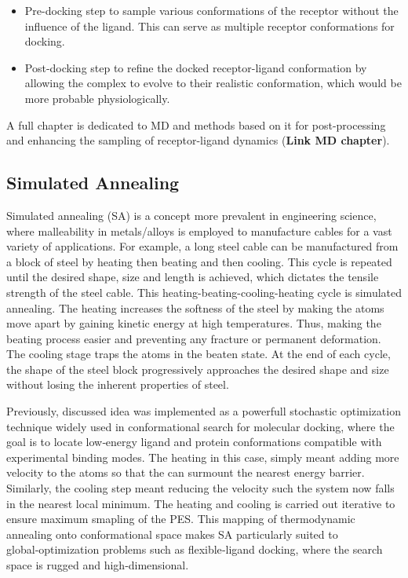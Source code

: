 \documentclass[12pt]{article}
\begin{document}
\begin{itemize}
\item Pre-docking step to sample various conformations of the receptor without the influence of the ligand.  This can serve as multiple receptor conformations for docking. 
\item Post-docking step to refine the docked receptor-ligand conformation by allowing the complex to evolve to their realistic conformation, which would be more probable physiologically.
\end{itemize}

A full chapter is dedicated to MD and methods based on it for post-processing and enhancing the sampling of receptor-ligand dynamics (\textbf{Link MD chapter}). 

\subsection{Simulated Annealing}

Simulated annealing (SA) is a concept more prevalent in engineering science, where malleability in metals/alloys is employed to manufacture cables for a vast variety of applications. For example, a long steel cable can be manufactured from a block of steel by heating then beating and then cooling. This cycle is repeated until the desired shape, size and length is achieved, which dictates the tensile strength of the steel cable. This heating-beating-cooling-heating cycle is simulated annealing. The heating increases the softness of the steel by making the atoms move apart by gaining kinetic energy at high temperatures. Thus, making the beating process easier and preventing any fracture or permanent deformation. The cooling stage traps the atoms in the beaten state. At the end of each cycle, the shape of the steel block progressively approaches the desired shape and size without losing the inherent properties of steel.

Previously, discussed idea was implemented as a powerfull stochastic optimization technique\cite{CH2_Kirkpatrick1983} widely used in conformational search for molecular docking, where the goal is to locate low‑energy ligand and protein conformations compatible with experimental binding modes. The heating in this case, simply meant adding more velocity to the atoms so that the can surmount the nearest energy barrier. Similarly, the cooling step meant reducing the velocity such the system now falls in the nearest local minimum. The heating and cooling is carried out iterative to ensure maximum smapling of the PES. This mapping of thermodynamic annealing onto conformational space makes SA particularly suited to global‑optimization problems such as flexible‑ligand docking, where the search space is rugged and high‑dimensional\cite{CH2_Ghose1993,CH2_Naidoo1997,CH2_Corcho2000}.
\end{document}
